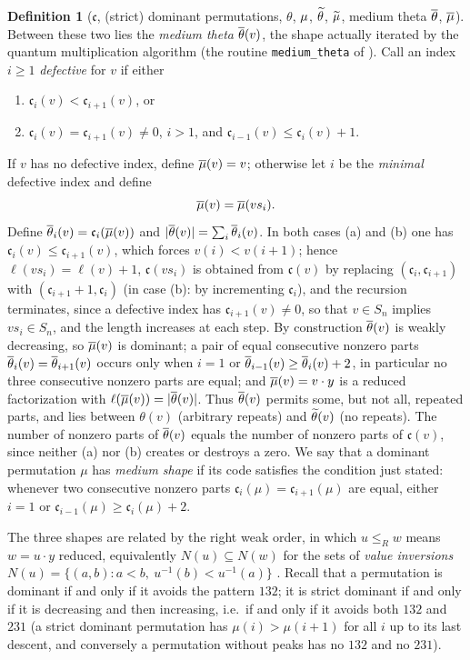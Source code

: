 \documentclass{amsart}
\theoremstyle{definition}
\newtheorem{definition}[lemma]{Definition}
\theoremstyle{remark}
\numberwithin{equation}{section}
\newcommand{\code}{\mathfrak{c}}
\begin{document}
\begin{definition}[$\code$, (strict) dominant permutations, $\theta$, $\mu$, $\widetilde{\theta}$, $\widetilde{\mu}$, medium theta $\overline{\theta}$, $\overline{\mu}$]
Between these two lies the \emph{medium theta} $\overline{\theta}(v)$, the shape actually iterated by the quantum multiplication algorithm (the routine \texttt{medium\_theta} of \cite{schubmult}). Call an index $i\geq1$ \emph{defective} for $v$ if either
\begin{enumerate}
\item[(a)] $\code_i(v)<\code_{i+1}(v)$, or
\item[(b)] $\code_i(v)=\code_{i+1}(v)\neq0$, $i>1$, and $\code_{i-1}(v)\leq\code_i(v)+1$.
\end{enumerate}
If $v$ has no defective index, define $\overline{\mu}(v)=v$; otherwise let $i$ be the \emph{minimal} defective index and define
$$\overline{\mu}(v)=\overline{\mu}(vs_i).$$
Define $\medtheta_i(v)=\code_i(\medperm(v))$ and $|\overline{\theta}(v)|=\sum_i\overline{\theta}_i(v)$. In both cases (a) and (b) one has $\code_i(v)\leq\code_{i+1}(v)$, which forces $v(i)<v(i+1)$; hence $\ell(vs_i)=\ell(v)+1$, $\code(vs_i)$ is obtained from $\code(v)$ by replacing $(\code_i,\code_{i+1})$ with $(\code_{i+1}+1,\code_i)$ (in case (b): by incrementing $\code_i$), and the recursion terminates, since a defective index has $\code_{i+1}(v)\neq0$, so that $v\in S_n$ implies $vs_i\in S_n$, and the length increases at each step. By construction $\overline{\theta}(v)$ is weakly decreasing, so $\overline{\mu}(v)$ is dominant; a pair of equal consecutive nonzero parts $\overline{\theta}_i(v)=\overline{\theta}_{i+1}(v)$ occurs only when $i=1$ or $\overline{\theta}_{i-1}(v)\geq\overline{\theta}_i(v)+2$, in particular no three consecutive nonzero parts are equal; and $\overline{\mu}(v)=v\cdot y$ is a reduced factorization with $\ell(\overline{\mu}(v))=|\overline{\theta}(v)|$. Thus $\overline{\theta}(v)$ permits some, but not all, repeated parts, and lies between $\theta(v)$ (arbitrary repeats) and $\widetilde{\theta}(v)$ (no repeats). The number of nonzero parts of $\overline{\theta}(v)$ equals the number of nonzero parts of $\code(v)$, since neither (a) nor (b) creates or destroys a zero. We say that a dominant permutation $\mu$ has \emph{medium shape} if its code satisfies the condition just stated: whenever two consecutive nonzero parts $\code_i(\mu)=\code_{i+1}(\mu)$ are equal, either $i=1$ or $\code_{i-1}(\mu)\geq\code_i(\mu)+2$.
\end{definition}

The three shapes are related by the right weak order, in which $u\leq_Rw$ means $w=u\cdot y$ reduced, equivalently $N(u)\subseteq N(w)$ for the sets of \emph{value inversions} $N(u)=\{(a,b):a<b,\ u^{-1}(b)<u^{-1}(a)\}$ \cite[Proposition~3.1.3]{combcox}. Recall that a permutation is dominant if and only if it avoids the pattern $132$; it is strict dominant if and only if it is decreasing and then increasing, i.e.\ if and only if it avoids both $132$ and $231$ (a strict dominant permutation has $\mu(i)>\mu(i+1)$ for all $i$ up to its last descent, and conversely a permutation without peaks has no $132$ and no $231$).
\end{document}
